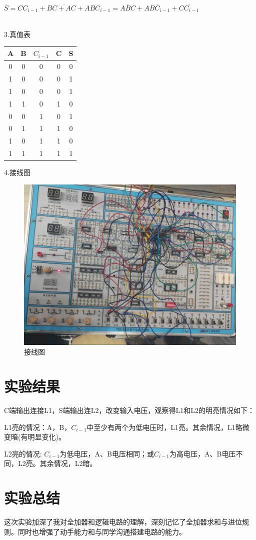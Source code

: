 \documentclass{article}
\begin{document}
$\overline{S}=\overline{CC_{i-1}+BC+AC+ABC_{i-1}}=\overline{ABC}+\overline{ABC_{i-1}}+\overline{CC_{i-1}}$

~\\
3.真值表

\begin{tabular}{|c|c|c|c|c|}
	\hline
	A&B&$C_{i-1}$&C&S\\
	\hline
	0&0&0&0&0\\
	\hline
	1&0&0&0&1\\
	\hline
	1&0&0&0&1\\
	\hline
	1&1&0&1&0\\
	\hline
	0&0&1&0&1\\
	\hline
	0&1&1&1&0\\
	\hline
	1&0&1&1&0\\
	\hline
	1&1&1&1&1\\
	\hline	
\end{tabular}

\newpage
4.接线图

\begin{figure}[htbp]
\centering
\includegraphics[scale=0.5]{4.png}
\caption{接线图}
\label{figure}
\end{figure}

\section{实验结果}
C端输出连接L1，S端输出连L2，改变输入电压，观察得L1和L2的明亮情况如下：

L1亮的情况：A，B，$C_{i-1}$中至少有两个为低电压时，L1亮。其余情况，L1略微变暗(有明显变化)。

L2亮的情况: $C_{i-1}$为低电压，A、B电压相同；或$C_{i-1}$为高电压，A、B电压不同，L2亮。其余情况，L2暗。

\section{实验总结}

这次实验加深了我对全加器和逻辑电路的理解，深刻记忆了全加器求和与进位规则。同时也增强了动手能力和与同学沟通搭建电路的能力。
\end{document}
